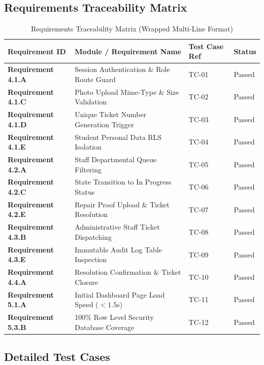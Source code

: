 \documentclass[12pt, a4paper]{article}
\begin{document}
\subsection{Requirements Traceability Matrix}

\begin{table}[H]
    \centering
    \caption{Requirements Traceability Matrix (Wrapped Multi-Line Format)}
    \small
    \begin{tabularx}{\textwidth}{p{} X p{} p{}}
        \toprule
        \textbf{Requirement ID} & \textbf{Module / Requirement Name} & \textbf{Test Case Ref} & \textbf{Status} \\
        \midrule
        \textbf{Requirement 4.1.A} & Session Authentication \& Role Route Guard & TC-01 & Passed \\
        \textbf{Requirement 4.1.C} & Photo Upload Mime-Type \& Size Validation & TC-02 & Passed \\
        \textbf{Requirement 4.1.D} & Unique Ticket Number Generation Trigger & TC-03 & Passed \\
        \textbf{Requirement 4.1.E} & Student Personal Data RLS Isolation & TC-04 & Passed \\
        \textbf{Requirement 4.2.A} & Staff Departmental Queue Filtering & TC-05 & Passed \\
        \textbf{Requirement 4.2.C} & State Transition to In Progress Status & TC-06 & Passed \\
        \textbf{Requirement 4.2.E} & Repair Proof Upload \& Ticket Resolution & TC-07 & Passed \\
        \textbf{Requirement 4.3.B} & Administrative Staff Ticket Dispatching & TC-08 & Passed \\
        \textbf{Requirement 4.3.E} & Immutable Audit Log Table Inspection & TC-09 & Passed \\
        \textbf{Requirement 4.4.A} & Resolution Confirmation \& Ticket Closure & TC-10 & Passed \\
        \textbf{Requirement 5.1.A} & Initial Dashboard Page Load Speed ($<1.5$s) & TC-11 & Passed \\
        \textbf{Requirement 5.3.B} & 100\% Row Level Security Database Coverage & TC-12 & Passed \\
        \bottomrule
    \end{tabularx}
\end{table}

\subsection{Detailed Test Cases}
\end{document}
